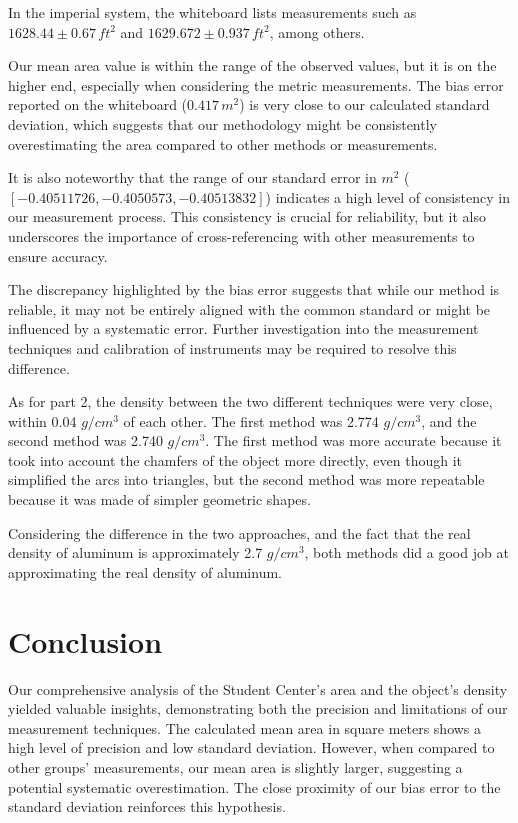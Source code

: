 \documentclass{article}
\begin{document}
In the imperial system, the whiteboard lists measurements such as \(1628.44 \pm 0.67 \, ft^2\) and \(1629.672 \pm 0.937 \, ft^2\), among others.

Our mean area value is within the range of the observed values, but it is on the higher end, especially when considering the metric measurements. The bias error reported on the whiteboard (\(0.417 \, m^2\)) is very close to our calculated standard deviation, which suggests that our methodology might be consistently overestimating the area compared to other methods or measurements.

It is also noteworthy that the range of our standard error in \(m^2\) (\([-0.40511726, -0.4050573, -0.40513832]\)) indicates a high level of consistency in our measurement process. This consistency is crucial for reliability, but it also underscores the importance of cross-referencing with other measurements to ensure accuracy.

The discrepancy highlighted by the bias error suggests that while our method is reliable, it may not be entirely aligned with the common standard or might be influenced by a systematic error. Further investigation into the measurement techniques and calibration of instruments may be required to resolve this difference.

As for part 2, the density between the two different techniques were very close, within 0.04 \(g/cm^3\) of each other. The first method was 2.774 \(g/cm^3\), and the second method was 2.740 \(g/cm^3\). The first method was more accurate because it took into account the chamfers of the object more directly, even though it simplified the arcs into triangles, but the second method was more repeatable because it was made of simpler geometric shapes.

Considering the difference in the two approaches, and the fact that the real density of aluminum is approximately 2.7 \(g/cm^3\), both methods did a good job at approximating the real density of aluminum.

\section{Conclusion}

Our comprehensive analysis of the Student Center's area and the object's density yielded valuable insights, demonstrating both the precision and limitations of our measurement techniques. The calculated mean area in square meters shows a high level of precision and low standard deviation. However, when compared to other groups' measurements, our mean area is slightly larger, suggesting a potential systematic overestimation. The close proximity of our bias error to the standard deviation reinforces this hypothesis.
\end{document}
